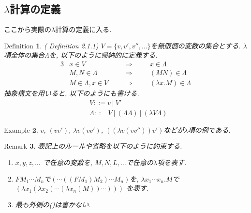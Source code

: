 \documentclass[11pt]{jsreport}
\theoremstyle{mystyle}
\newtheorem{df}{$\textrm{Definition}$}[subsection]
\newtheorem{ex}[df]{$\textrm{Example}$}
\newtheorem{rmk}[df]{$\textrm{Remark}$}
\newcommand{\Lra}{\Longrightarrow}
\newcommand{\0}{\textbf{0}}
\newcommand{\1}{\textbf{1}}
\newcommand{\2}{\textbf{2}}
\begin{document}
\subsection*{$\lambda$計算の定義}
ここから実際の$\lambda$計算の定義に入る. 
\begin{shadebox}
  \begin{df}{(\cite{Bar} Definition 2.1.1)}
    $V = \{ v, v', v'', \ldots \}$を無限個の変数の集合とする. 
    $\lambda$項全体の集合$\Lambda$を, 以下のように帰納的に定義する. 
    \begin{alignat*}{3}
      &x \in V& \quad &\Lra& \quad &x \in \Lambda \\
      &M, N \in \Lambda& &\Lra& &(MN) \in \Lambda \\
      &M \in \Lambda, x \in V& &\Lra& &(\lambda x . M) \in \Lambda
    \end{alignat*}
    抽象構文を用いると, 以下のようにも書ける. 
    \begin{align*}
      &V ::= v\ |\ V' \\
      &\Lambda ::= V\ |\ (\Lambda \Lambda)\ |\ (\lambda V \Lambda)
    \end{align*}
  \end{df}
\end{shadebox}
\begin{ex}
  $v$, $(v v')$, $\lambda v (v v')$, $((\lambda v (vv''))v')$などが$\lambda$項の例である. 
\end{ex}
\begin{rmk}
表記上のルールや省略を以下のように約束する. 
\begin{enumerate}
  \item $x, y, z, \ldots$ で任意の変数を, $M, N, L, \ldots$で任意の$\lambda$項を表す. 
  \item $F M_1 \cdots M_n$で$(\cdots ((F M_1) M_2)\cdots M_n)$を, 
           $\lambda x_1 \cdots x_n .M$で
           $(\lambda x_1 (\lambda x_2 (\cdots (\lambda x_n(M))\cdots)))$
            を表す. 
  \item 最も外側の()は書かない. 
\end{enumerate}
\end{rmk}
\end{document}
